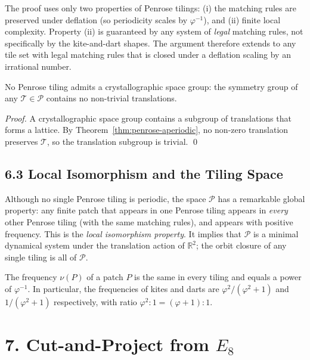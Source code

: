\begin{remark}
The proof uses only two properties of Penrose
tilings: (i) the matching rules are preserved
under deflation (so periodicity scales by
\(\varphi^{-1}\)), and (ii) finite local
complexity. Property (ii) is guaranteed by any
system of \emph{legal} matching rules, not
specifically by the kite-and-dart shapes. The
argument therefore extends to any tile set with
legal matching rules that is closed under a
deflation scaling by an irrational number.
\end{remark}

\begin{corollary}
\label{cor:no-crystal}
No Penrose tiling admits a crystallographic space
group: the symmetry group of any \(\mathcal{T}
\in \mathcal{P}\) contains no non-trivial
translations.
\end{corollary}

\begin{proof}
A crystallographic space group contains a
subgroup of translations that forms a lattice. By
Theorem~\ref{thm:penrose-aperiodic}, no non-zero
translation preserves \(\mathcal{T}\), so the
translation subgroup is trivial. \qed
\end{proof}

\subsection{6.3 Local Isomorphism and the
Tiling Space}\label{sec:local-iso}

Although no single Penrose tiling is periodic, the
space \(\mathcal{P}\) has a remarkable global
property: any finite patch that appears in one
Penrose tiling appears in \emph{every} other
Penrose tiling (with the same matching rules), and
appears with positive frequency. This is the
\emph{local isomorphism property}. It implies that
\(\mathcal{P}\) is a minimal dynamical system
under the translation action of \(\mathbb{R}^2\);
the orbit closure of any single tiling is all of
\(\mathcal{P}\).

The frequency \(\nu(P)\) of a patch \(P\) is the
same in every tiling and equals a power of
\(\varphi^{-1}\). In particular, the frequencies
of kites and darts are \(\varphi^2/(\varphi^2+1)\)
and \(1/(\varphi^2+1)\) respectively, with ratio
\(\varphi^2 : 1 = (\varphi + 1) : 1\).

\section{7. Cut-and-Project from
\texorpdfstring{$E_8$}{E8}}\label{sec:cut-project}

